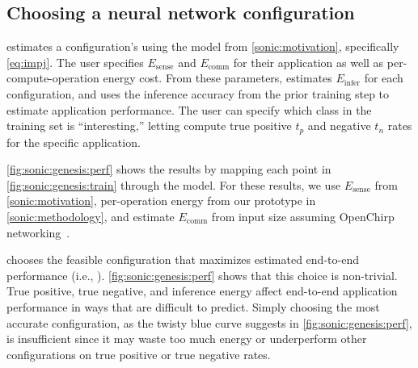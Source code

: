 \subsection{Choosing a neural network configuration}

\genesis estimates a configuration's \metric using the model
from \autoref{sonic:motivation}, specifically \autoref{eq:impj}.
%
The user specifies $E_\text{sense}$ and $E_\text{comm}$ for their
application as well as per-compute-operation energy cost.
%
From these parameters, \genesis estimates $E_\text{infer}$ for each
configuration, and uses the inference accuracy from the prior training step to
estimate application performance.
%
The user can specify which class in the training set is
``interesting,'' letting \genesis compute true positive $t_p$ and negative $t_n$ rates for the
specific application.

\autoref{fig:sonic:genesis:perf} shows the results by mapping each point in
\autoref{fig:sonic:genesis:train} through the model.
%
For these results, we use $E_\text{sense}$ from
\autoref{sonic:motivation}, per-operation energy from our \sonictails
prototype in \autoref{sonic:methodology}, and estimate $E_\text{comm}$
from input size assuming OpenChirp networking~\cite{dongare2017openchirp}.

\genesis chooses the feasible configuration that maximizes
estimated end-to-end performance (i.e., \metric).
%
\autoref{fig:sonic:genesis:perf} shows that this choice is non-trivial.
%
True positive, true negative, and inference energy affect end-to-end application
performance in ways that are difficult to predict. Simply choosing the most accurate
configuration, as the twisty blue curve suggests in \autoref{fig:sonic:genesis:perf}, 
is insufficient since it may waste too much energy or underperform other 
configurations on true positive or true negative rates.
